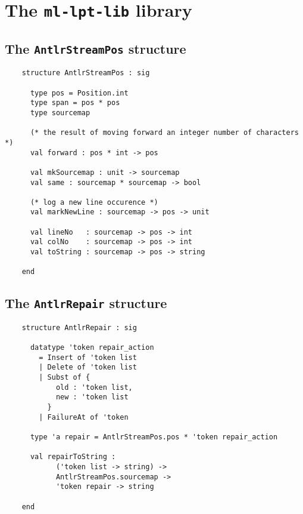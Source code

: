 \chapter{The {\tt ml-lpt-lib} library}\label{ch:ml-lpt-lib}



\section{The {\tt AntlrStreamPos} structure}

\begin{verbatim}
    structure AntlrStreamPos : sig

      type pos = Position.int
      type span = pos * pos
      type sourcemap

      (* the result of moving forward an integer number of characters *)
      val forward : pos * int -> pos

      val mkSourcemap : unit -> sourcemap
      val same : sourcemap * sourcemap -> bool

      (* log a new line occurence *)
      val markNewLine : sourcemap -> pos -> unit

      val lineNo   : sourcemap -> pos -> int
      val colNo    : sourcemap -> pos -> int
      val toString : sourcemap -> pos -> string

    end
\end{verbatim}


\section{The {\tt AntlrRepair} structure}

\begin{verbatim}
    structure AntlrRepair : sig

      datatype 'token repair_action
        = Insert of 'token list
        | Delete of 'token list
        | Subst of {
            old : 'token list,
            new : 'token list
          }
        | FailureAt of 'token
      
      type 'a repair = AntlrStreamPos.pos * 'token repair_action
      
      val repairToString : 
            ('token list -> string) -> 
            AntlrStreamPos.sourcemap -> 
            'token repair -> string
        
    end
\end{verbatim}